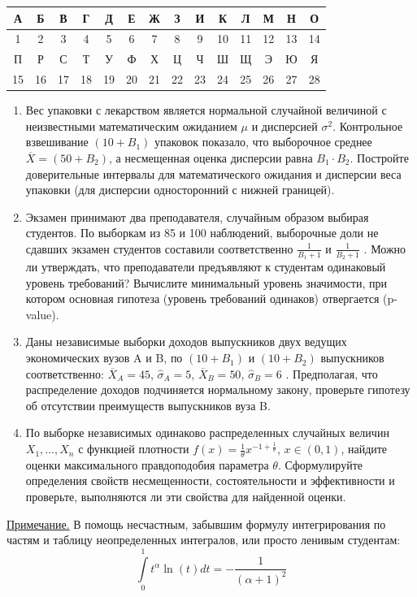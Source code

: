 \documentclass[12pt, a4paper]{article}\usepackage[]{graphicx}\usepackage[]{color}
\begin{document}
\begin{center}
\begin{tabular}{|c|c|c|c|c|c|c|c|c|c|c|c|c|c|}
\hline  А & Б & В & Г & Д & Е & Ж & З & И & К & Л & М & Н & О \\
\hline 1 & 2 & 3 & 4 & 5 & 6 & 7 & 8 & 9 & 10 & 11 & 12 & 13 & 14 \\
\hline  П & Р & С & Т & У & Ф & Х & Ц & Ч & Ш & Щ & Э & Ю & Я \\
\hline 15& 16  &  17 &  18&  19&  20&  21& 22 & 23 &  24& 25 & 26  &  27 & 28 \\
\hline
\end{tabular}
\end{center}
\begin{enumerate}
\item Вес упаковки с лекарством является нормальной случайной величиной с неизвестными математическим ожиданием  $\mu$ и дисперсией $\sigma^2$. Контрольное взвешивание $(10+B_1)$ упаковок показало, что выборочное среднее  $\overline{X} = (50+B_2)$, а  несмещенная оценка дисперсии равна $B_1\cdot B_2$. Постройте  доверительные интервалы для математического ожидания и дисперсии веса упаковки (для дисперсии односторонний с нижней границей).

\item Экзамен принимают два преподавателя, случайным образом выбирая студентов.  По выборкам из 85 и 100 наблюдений, выборочные доли не сдавших экзамен студентов составили соответственно $\frac{1}{B_1+1}$ и $\frac{1}{B_2+1}$ . Можно ли утверждать, что преподаватели предъявляют к студентам одинаковый уровень требований? Вычислите минимальный уровень значимости, при котором основная гипотеза (уровень требований одинаков) отвергается (p-value).

\item Даны независимые выборки доходов выпускников двух ведущих экономических вузов A и B, по $(10+B_1)$ и $(10+B_2)$ выпускников соответственно: $\overline{X}_A=45$, $\hat{\sigma}_A=5$, $\overline{X}_B=50$, $\hat{\sigma}_B=6$ .
Предполагая, что распределение доходов подчиняется нормальному закону, проверьте гипотезу об отсутствии преимуществ выпускников вуза B.

\item 	По выборке независимых одинаково распределенных случайных величин\\ $X_1,\dots,X_n$ с функцией плотности $f(x)=\frac{1}{\theta} x^{-1+\frac{1}{\theta}}$, $x\in(0, 1)$, найдите оценки максимального правдоподобия параметра $\theta$. Сформулируйте определения свойств несмещенности, состоятельности и эффективности и проверьте, выполняются ли эти свойства для найденной оценки.
\end{enumerate}
\underline{Примечание.} В помощь несчастным, забывшим формулу интегрирования по частям и таблицу неопределенных интегралов, или просто ленивым студентам:
\[
\int\limits_{0}^1 t^\alpha \ln (t) dt = -\frac{1}{(\alpha+1)^2}
\]
\end{document}
